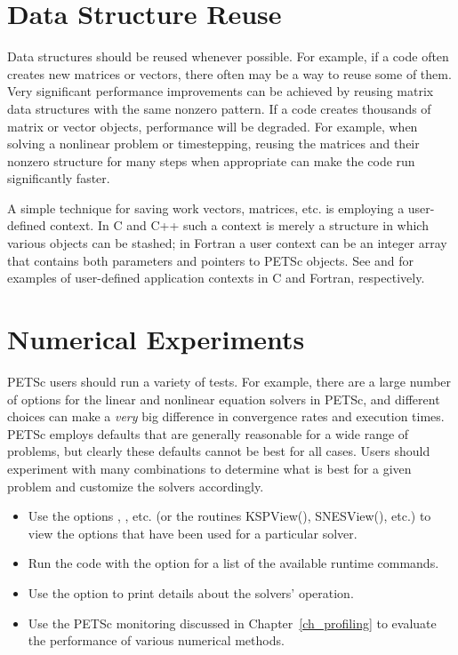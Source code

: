 {{\section{Data Structure Reuse}
\label{sec_dsreuse}

Data structures should be reused whenever possible.  For example, if a code often
creates new matrices or vectors, there often may be a way to reuse some
of them.  Very significant performance improvements can be achieved by
reusing matrix data structures with the same nonzero pattern.  If a code
creates thousands of matrix or vector objects, performance will be
degraded.  For example, when solving a nonlinear problem or timestepping,
reusing the matrices and their nonzero structure for many steps when
 appropriate can make the code run significantly faster.

A simple technique for saving work vectors, matrices, etc. is employing
a user-defined context.  In C and C++ such a context is merely a
structure in which various objects can be stashed; in Fortran a user
context can be an integer array that contains both parameters and pointers
to PETSc objects. See  and
 for examples of user-defined application
contexts in C and Fortran, respectively.

\section{Numerical Experiments}

PETSc users should run a variety of tests.  For example, there are a large number of options
for the linear and nonlinear equation solvers in PETSc, and different
choices can make a {\em very} big difference in convergence rates and execution
times.  PETSc employs defaults that are generally reasonable for a wide
range of problems, but clearly these defaults cannot be best for all
cases.  Users should experiment with many combinations to determine
what is best for a given problem and customize the solvers accordingly.
\begin{itemize}
\item Use the options , , etc. (or the routines
     KSPView(), SNESView(), etc.) to view the options that have been
     used for a particular solver.
\item Run the code with the option  for a list of the available
     runtime commands.
\item Use the option  to print details about the solvers' operation.
\item Use the PETSc monitoring discussed in Chapter~\ref{ch_profiling}
     to evaluate the performance of various numerical methods.
\end{itemize}

}}
